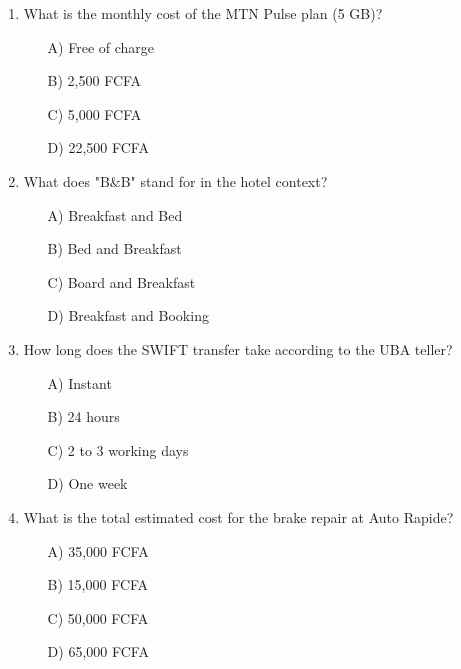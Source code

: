 \documentclass[11pt]{article}
\begin{document}
\begin{exercice}
\begin{enumerate}
    \item What is the monthly cost of the MTN Pulse plan (5 GB)?
    \begin{itemize}
        \item[A)] Free of charge
        \item[B)] 2,500 FCFA
        \item[C)] 5,000 FCFA
        \item[D)] 22,500 FCFA
    \end{itemize}
    \item What does "B\&B" stand for in the hotel context?
    \begin{itemize}
        \item[A)] Breakfast and Bed
        \item[B)] Bed and Breakfast
        \item[C)] Board and Breakfast
        \item[D)] Breakfast and Booking
    \end{itemize}
    \item How long does the SWIFT transfer take according to the UBA teller?
    \begin{itemize}
        \item[A)] Instant
        \item[B)] 24 hours
        \item[C)] 2 to 3 working days
        \item[D)] One week
    \end{itemize}
    \item What is the total estimated cost for the brake repair at Auto Rapide?
    \begin{itemize}
        \item[A)] 35,000 FCFA
        \item[B)] 15,000 FCFA
        \item[C)] 50,000 FCFA
        \item[D)] 65,000 FCFA
    \end{itemize}
\end{enumerate}
\end{exercice}
\end{document}
